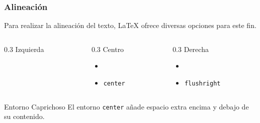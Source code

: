 \documentclass[12pt,aspectratio=169,ignorenonframetext]{ltxbeamer}
\begin{document}
\begin{frame}[fragile]
\frametitle{Alineación}

Para realizar la alineación del texto, {\lmr\LaTeX} ofrece diversas opciones para este fin.

\pause\bigskip

\begin{columns}
    \begin{column}{0.3\textwidth}
        {\Large Izquierda}\bigskip

    \end{column}
    \begin{column}{0.3\textwidth}
        {\Large Centro}\bigskip

        \begin{itemize}
            \item \texttt{\centering}
            \item \texttt{center}
        \end{itemize}
    \end{column}
    \begin{column}{0.3\textwidth}
        {\Large Derecha}\bigskip

        \begin{itemize}
            \item \texttt{\raggedleft}
            \item \texttt{flushright}
        \end{itemize}
    \end{column}
\end{columns}

\pause\bigskip

\begin{block}{Entorno Caprichoso}
    El entorno \texttt{center} añade espacio extra encima y debajo de su contenido.
\end{block}
\end{frame}
\end{document}

